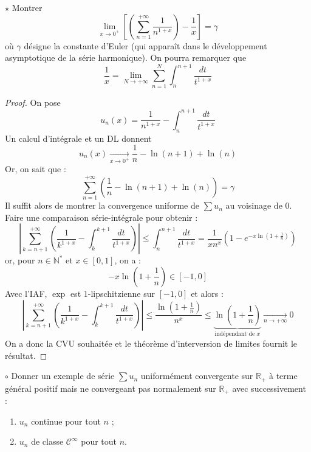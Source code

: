 \documentclass[french,a4paper]{article}
\newcommand{\N}{\mathbb{N}}
\newcommand{\R}{\mathbb{R}}
\newcommand{\st}{^*}
\theoremstyle{plain}
\theoremstyle{definition}
\theoremstyle{remark}
\begin{document}
\begin{ex}{$\star$}
	Montrer $$\lim_{x\to 0^+}\left[\left(\sum_{n=1}^{+\infty}\frac{1}{n^{1+x}}\right)-\frac{1}{x}\right]=\gamma$$ où $\gamma$ désigne la constante d'Euler (qui apparaît dans le développement asymptotique de la série harmonique). On pourra remarquer que $$\frac{1}{x}=\lim_{N\to+\infty}\sum_{n=1}^{N}\int_{n}^{n+1}\frac{dt}{t^{1+x}}$$
\end{ex}
\begin{proof}
	On pose $$u_n(x)=\frac{1}{n^{1+x}}-\int_{n}^{n+1}\frac{dt}{t^{1+x}}$$ Un calcul d'intégrale et un DL donnent $$u_n(x)\xrightarrow[x\to 0^+]{}\frac{1}{n}-\ln(n+1)+\ln(n)$$ Or, on sait que : $$\sum_{n=1}^{+\infty}\left(\frac{1}{n}-\ln(n+1)+\ln(n)\right)=\gamma$$ Il suffit alors de montrer la convergence uniforme de $\sum u_n$ au voisinage de $0$. Faire une comparaison série-intégrale pour obtenir : $$\left\lvert\sum_{k=n+1}^{+\infty}\left(\frac{1}{k^{1+x}}-\int_{k}^{k+1}\frac{dt}{t^{1+x}}\right)\right\rvert\leqslant\int_{n}^{n+1}\frac{dt}{t^{1+x}}=\frac{1}{xn^x}\left(1-e^{-x\ln\left(1+\frac{1}{n}\right)}\right)$$ or, pour $n\in\N\st$ et $x\in[0,1]$, on a : $$-x\ln\left(1+\frac{1}{n}\right)\in[-1,0]$$ Avec l'IAF, $\exp$ est $1$-lipschitzienne sur $[-1,0]$ et alors : $$\left\lvert\sum_{k=n+1}^{+\infty}\left(\frac{1}{k^{1+x}}-\int_{k}^{k+1}\frac{dt}{t^{1+x}}\right)\right\rvert\leqslant\frac{\ln\left(1+\frac{1}{n}\right)}{n^x}\leqslant\underbrace{\ln\left(1+\frac{1}{n}\right)}_{\text{indépendant de }x}\xrightarrow[n\to+\infty]{}0$$ On a donc la CVU souhaitée et le théorème d'interversion de limites fournit le résultat.
\end{proof}

\begin{ex}{$\circ$}
	Donner un exemple de série $\sum u_n$ uniformément convergente sur $\R_+$ à terme général positif mais ne convergeant pas normalement sur $\R_+$ avec successivement :
	\begin{enumerate}
		\item $u_n$ continue pour tout $n$ ;
		\item $u_n$ de classe $\mathcal{C}^\infty$ pour tout $n$.
	\end{enumerate}
\end{ex}
\end{document}
